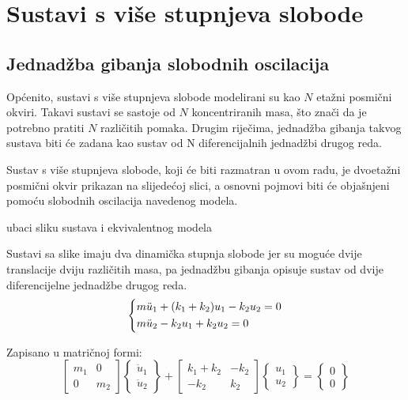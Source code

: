 \chapter{Sustavi s više stupnjeva slobode}
\section{Jednadžba gibanja slobodnih oscilacija}\label{slobodne_oscilacije}
Općenito, sustavi s više stupnjeva slobode modelirani su kao $N$ etažni posmični
okviri. Takavi sustavi se sastoje od $N$ koncentriranih masa, što znači da je potrebno 
pratiti $N$ različitih pomaka. Drugim riječima, jednadžba gibanja takvog sustava biti će
zadana kao sustav od N diferencijalnih jednadžbi drugog reda.
\par

Sustav s više stupnjeva slobode, koji će biti razmatran u ovom radu, je dvoetažni
posmični okvir prikazan na slijedećoj slici, a osnovni pojmovi biti će objašnjeni
pomoću slobodnih oscilacija navedenog modela.

\par
ubaci sliku sustava i ekvivalentnog modela
\par

Sustavi sa slike imaju dva dinamička stupnja slobode jer su moguće dvije translacije
dviju različitih masa, pa jednadžbu gibanja opisuje sustav od dvije diferencijelne
jednadžbe drugog reda.
\begin{equation}\label{eq:sustav_diferencijalnih}
    \begin{dcases}
        m\ddot{u}_1 + (k_1+k_2)u_1 -k_2u_2 = 0\\
        m\ddot{u}_2 - k_2u_1 + k_2 u_2 = 0
    \end{dcases}
\end{equation}

Zapisano u matričnoj formi:
\begin{equation}\label{eq:sustav_diferencijalnih_matricno}
    \begin{bmatrix}
        m_1 & 0 \\
        0   & m_2
    \end{bmatrix}
    \begin{Bmatrix}
        \ddot{u}_1\\
        \ddot{u}_2
    \end{Bmatrix}
    +
    \begin{bmatrix}
        k_1+k_2 & -k_2\\
        -k_2 & k_2
    \end{bmatrix}
    \begin{Bmatrix}
        u_1\\
        u_2
    \end{Bmatrix}
    =
    \begin{Bmatrix}
        0\\
        0
    \end{Bmatrix}
\end{equation}

